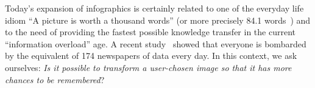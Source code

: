 \documentclass{sig-alternate-05-2015}
\begin{document}
Today's expansion of infographics is certainly related to one of the everyday life idiom ``A picture is worth a thousand words'' (or more precisely 84.1 words~\cite{blackwell1997correction}) and to the need of providing the fastest possible knowledge transfer in the current ``information overload'' age. A recent study~\cite{hilbert2012much} showed that everyone is bombarded by the equivalent of 174 newspapers of data every day. In this context, we ask ourselves: \emph{Is it possible to transform a user-chosen image so that it has more chances to be remembered}?

\end{document}
